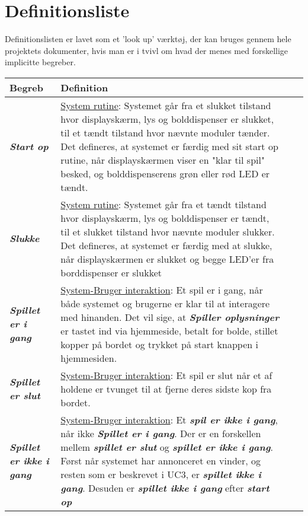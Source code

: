 \documentclass[Kravspecifikation/Kravspec_Main.tex]{subfiles}
\begin{document}
\section{Definitionsliste}
Definitionslisten er lavet som et 'look up' værktøj, der kan bruges gennem hele projektets dokumenter, hvis man er i tvivl om hvad der menes med forskellige implicitte begreber.
\begin{longtable}{|>{\centering\arraybackslash}m{3cm}|>{\RaggedRight\arraybackslash}m{10cm}| p{} | p{}|} 
\hline
        \large{Begreb} & \large{Definition}\\
        \hline
        \textit{\textbf{Start op}} & \underline{System rutine}:
        Systemet går fra et slukket tilstand hvor displayskærm, lys og bolddispenser er slukket, til et tændt tilstand hvor nævnte moduler tænder. Det defineres, at systemet er færdig med sit start op rutine, når displayskærmen viser en "klar til spil" besked, og bolddispenserens grøn eller rød LED er tændt.\\
        \hline
        \textit{\textbf{Slukke}} & \underline{System rutine}:
        Systemet går fra et tændt tilstand hvor displayskærm, lys og bolddispenser er tændt, til et slukket tilstand hvor nævnte moduler slukker. Det defineres, at systemet er færdig med at slukke, når displayskærmen er slukket og begge LED'er fra borddispenser er slukket\\
        \hline
        \textit{\textbf{Spillet er i gang}} & \underline{System-Bruger interaktion}:
        Et spil er i gang, når både systemet og brugerne er klar til at interagere med hinanden. Det vil sige, at \textit{\textbf{Spiller oplysninger}} er tastet ind via hjemmeside, betalt for bolde, stillet kopper på bordet og trykket på start knappen i hjemmesiden.\\
        \hline
        \textit{\textbf{Spillet er slut}} & \underline{System-Bruger interaktion}:
        Et spil er slut når et af holdene er tvunget til at fjerne deres sidste kop fra bordet.\\        
        \hline
        \textit{\textbf{Spillet er ikke i gang}} & \underline{System-Bruger interaktion}:
        Et \textbf{\textit{spil er ikke i gang}}, når ikke \textit{\textbf{Spillet er i gang}}. Der er en forskellen mellem \textbf{\textit{spillet er slut}} og \textbf{\textit{spillet er ikke i gang}}. Først når systemet har annonceret en vinder, og resten som er beskrevet i UC3, er \textit{\textbf{spillet ikke i gang}}. Desuden  er \textbf{\textit{spillet ikke i gang}} efter \textbf{\textit{start op}}\\

\end{longtable}
\end{document}
